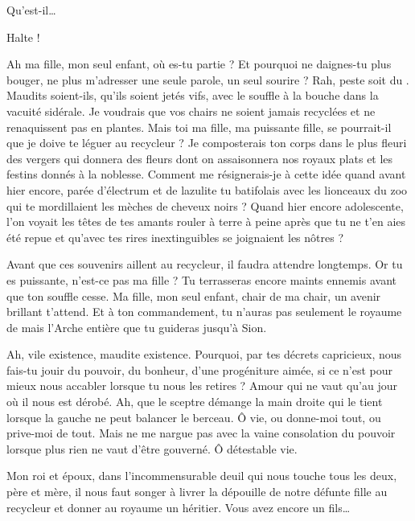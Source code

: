 \begin{drama}

  \elenaspeaks {} Qu’est-il…

  \kingsgardsspeaks {} Halte !

  \roispeaks {}  Ah ma fille, mon seul enfant, où es-tu partie ? Et pourquoi ne daignes-tu plus bouger, ne plus m’adresser une seule parole, un seul sourire ? Rah, peste soit du \campoppose{}. Maudits soient-ils, qu’ils soient jetés vifs, avec le souffle à la bouche dans la vacuité sidérale. Je voudrais que vos chairs ne soient jamais recyclées et ne renaquissent  pas en plantes. Mais toi ma fille, ma puissante fille, se pourrait-il que je doive te léguer au recycleur ? Je composterais ton corps dans le plus fleuri des vergers qui donnera des fleurs dont on assaisonnera nos royaux plats et les festins donnés à la noblesse. 
  Comment me résignerais-je à cette idée quand avant hier encore, parée d’électrum et de lazulite tu batifolais avec les lionceaux du zoo qui te mordillaient les mèches de cheveux noirs ? Quand hier encore adolescente, l’on voyait les têtes  de tes amants rouler à terre à peine après que tu ne t’en aies été repue et qu’avec tes rires inextinguibles se joignaient les nôtres ?

  Avant que ces souvenirs aillent au recycleur, il faudra attendre longtemps. Or tu es puissante, n’est-ce pas ma fille ? Tu terrasseras encore maints ennemis avant que ton souffle cesse. Ma fille, mon seul enfant, chair de ma chair, un avenir brillant t’attend. Et à ton commandement, tu n’auras pas seulement le royaume de \campprincipal{} mais l’Arche entière que tu guideras jusqu’à Sion.

  Ah, vile existence, maudite existence. Pourquoi, par tes décrets capricieux, nous fais-tu jouir du pouvoir, du bonheur, d’une progéniture aimée, si ce n’est pour mieux nous accabler lorsque tu nous les retires ? Amour qui ne vaut qu’au jour où il nous est dérobé. Ah, que le sceptre démange la main droite qui le tient lorsque la gauche ne peut balancer le berceau. Ô vie, ou donne-moi tout, ou prive-moi de tout. Mais ne me nargue pas  avec la vaine consolation du pouvoir lorsque plus rien ne vaut d’être gouverné. Ô détestable vie.

  \reinespeaks {} Mon roi et époux, dans l’incommensurable deuil qui nous touche tous les deux, père et mère, il nous faut songer à livrer la dépouille de notre défunte fille au recycleur et donner au royaume un héritier. Vous avez encore un fils…


\end{drama}
